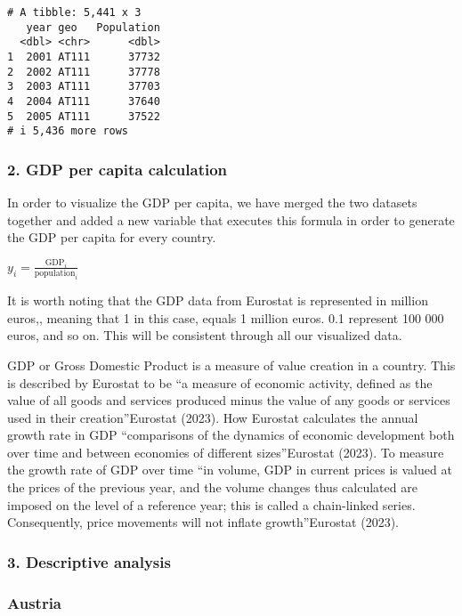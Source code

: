 \documentclass[
  letterpaper,
  DIV=11,
  numbers=noendperiod]{scrartcl}
\begin{document}
\begin{verbatim}
# A tibble: 5,441 x 3
   year geo   Population
  <dbl> <chr>      <dbl>
1  2001 AT111      37732
2  2002 AT111      37778
3  2003 AT111      37703
4  2004 AT111      37640
5  2005 AT111      37522
# i 5,436 more rows
\end{verbatim}

\hypertarget{gdp-per-capita-calculation}{%
\subsubsection{2. GDP per capita
calculation}\label{gdp-per-capita-calculation}}

In order to visualize the GDP per capita, we have merged the two
datasets together and added a new variable that executes this formula in
order to generate the GDP per capita for every country.

\(y_i = \frac{\text{GDP}_i}{\text{population}_i}\)

It is worth noting that the GDP data from Eurostat is represented in
million euros,, meaning that 1 in this case, equals 1 million euros. 0.1
represent 100 000 euros, and so on. This will be consistent through all
our visualized data.

GDP or Gross Domestic Product is a measure of value creation in a
country. This is described by Eurostat to be ``a measure of economic
activity, defined as the value of all goods and services produced minus
the value of any goods or services used in their creation''Eurostat
(2023). How Eurostat calculates the annual growth rate in GDP
``comparisons of the dynamics of economic development both over time and
between economies of different sizes''Eurostat (2023). To measure the
growth rate of GDP over time ``in volume, GDP in current prices is
valued at the prices of the previous year, and the volume changes thus
calculated are imposed on the level of a reference year; this is called
a chain-linked series. Consequently, price movements will not inflate
growth''Eurostat (2023).

\hypertarget{descriptive-analysis}{%
\subsubsection{3. Descriptive analysis}\label{descriptive-analysis}}

\hypertarget{austria}{%
\subsubsection{Austria}\label{austria}}
\end{document}
